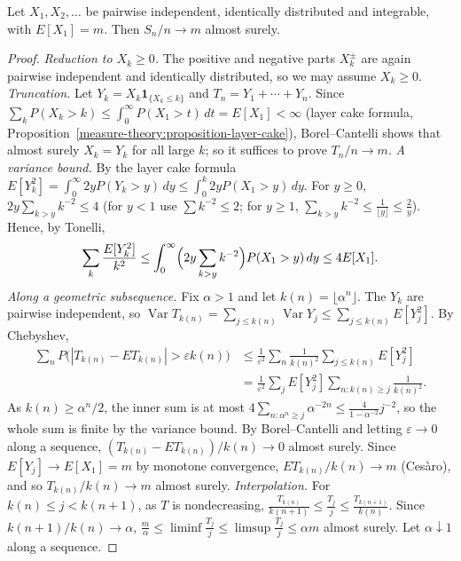 \begin{theorem}\label{probability:theorem-strong-law}
Let $X_1, X_2, \ldots$ be pairwise independent, identically distributed and integrable, with $E[X_1] = m$. Then $S_n/n \to m$ almost surely.
\end{theorem}

\begin{proof}
\emph{Reduction to $X_k \geq 0$.} The positive and negative parts $X_k^\pm$ are again pairwise independent and identically distributed, so we may assume $X_k \geq 0$.
\emph{Truncation.} Let $Y_k = X_k\mathbf{1}_{\{X_k \leq k\}}$ and $T_n = Y_1 + \cdots + Y_n$. Since $\sum_kP(X_k > k) \leq \int_0^\infty P(X_1 > t)\,dt = E[X_1] < \infty$ (layer cake formula,
Proposition~\ref{measure-theory:proposition-layer-cake}), Borel--Cantelli shows that almost surely $X_k = Y_k$ for all large $k$; so it suffices to prove $T_n/n \to m$.
\emph{A variance bound.} By the layer cake formula $E[Y_k^2] = \int_0^\infty2yP(Y_k > y)\,dy \leq \int_0^k2yP(X_1 > y)\,dy$. For $y \geq 0$, $2y\sum_{k > y}k^{-2} \leq 4$ (for $y < 1$ use $\sum k^{-2} \leq 2$; for $y \geq 1$,
$\sum_{k > y}k^{-2} \leq \frac{1}{\lfloor y\rfloor} \leq \frac2y$). Hence, by Tonelli,
\[
\sum_k\frac{E[Y_k^2]}{k^2} \leq \int_0^\infty\Bigl(2y\sum_{k > y}k^{-2}\Bigr)P(X_1 > y)\,dy \leq 4E[X_1].
\]
\emph{Along a geometric subsequence.} Fix $\alpha > 1$ and let $k(n) = \lfloor\alpha^n\rfloor$. The $Y_k$ are pairwise independent, so $\operatorname{Var}T_{k(n)} = \sum_{j \leq k(n)}\operatorname{Var}Y_j \leq \sum_{j \leq k(n)}E[Y_j^2]$. By Chebyshev,
\[
\begin{aligned}
\sum_nP\bigl(|T_{k(n)} - E T_{k(n)}| > \varepsilon k(n)\bigr) &\leq \frac{1}{\varepsilon^2}\sum_n\frac{1}{k(n)^2}\sum_{j \leq k(n)}E[Y_j^2] \\
&= \frac{1}{\varepsilon^2}\sum_jE[Y_j^2]\sum_{n : k(n) \geq j}\frac{1}{k(n)^2}.
\end{aligned}
\]
As $k(n) \geq \alpha^n/2$, the inner sum is at most $4\sum_{n : \alpha^n \geq j}\alpha^{-2n} \leq \frac{4}{1 - \alpha^{-2}}j^{-2}$, so the whole sum is finite by the variance bound. By Borel--Cantelli and letting $\varepsilon \to 0$ along a sequence,
$(T_{k(n)} - ET_{k(n)})/k(n) \to 0$ almost surely. Since $E[Y_j] \to E[X_1] = m$ by monotone convergence, $ET_{k(n)}/k(n) \to m$ (Ces\`aro), and so $T_{k(n)}/k(n) \to m$ almost surely.
\emph{Interpolation.} For $k(n) \leq j < k(n + 1)$, as $T$ is nondecreasing, $\frac{T_{k(n)}}{k(n + 1)} \leq \frac{T_j}{j} \leq \frac{T_{k(n+1)}}{k(n)}$. Since $k(n + 1)/k(n) \to \alpha$, $\frac m\alpha \leq \liminf\frac{T_j}{j} \leq \limsup\frac{T_j}{j} \leq \alpha m$
almost surely. Let $\alpha \downarrow 1$ along a sequence.
\end{proof}


